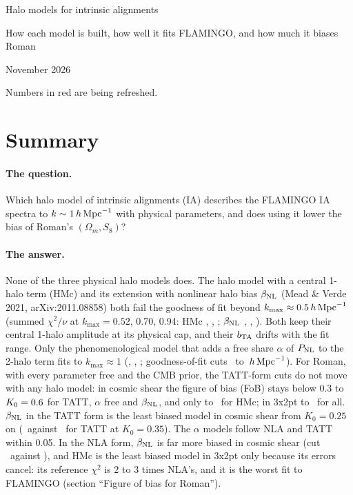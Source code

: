 \documentclass[11pt]{article}
\newcommand{\hMpc}{\,h\,{\rm Mpc}^{-1}}
\newcommand{\PNL}{P_{\rm NL}}
\newcommand{\bTA}{b_{\rm TA}}
\newcommand{\bNL}{\beta_{\rm NL}}
\newcommand{\kmax}{k_{\max}}
\newif\ifnumbersfinal
\begin{document}
\begin{center}
  {\LARGE Halo models for intrinsic alignments\par}
  \vspace{0.6em}
  {\large How each model is built, how well it fits FLAMINGO, and how much it biases Roman\par}
  \vspace{0.6em}
  {\large November 2026\par}
  \ifnumbersfinal\else
    \vspace{0.6em}
    {\color{red}Numbers in red are being refreshed.\par}
  \fi
\end{center}
\vspace{1em}

\section{Summary}
\label{sec:summary}

\paragraph{The question.}
Which halo model of intrinsic alignments (IA) describes the FLAMINGO IA
spectra to $k \sim 1\hMpc$ with physical parameters, and does using it
lower the bias of Roman's $(\Omega_m, S_8)$?

\paragraph{The answer.}
None of the three physical halo models does. The halo model with a central
1-halo term (HMc) and its extension with nonlinear halo bias $\bNL$ (Mead \&
Verde 2021, arXiv:2011.08858) both fail the goodness of fit beyond
$\kmax \approx 0.5\hMpc$ (summed $\chi^2/\nu$ at $\kmax = 0.52$, 0.70, 0.94:
HMc \gofTattHmcA, \gofTattHmcB, \gofTattHmcC; $\bNL$ \gofTattNlbA,
\gofTattNlbB, \gofTattNlbC). Both keep their central 1-halo amplitude at its
physical cap, and their $\bTA$ drifts with the fit range. Only the
phenomenological model that adds a free share $\alpha$ of $\PNL$ to the
2-halo term fits to $\kmax \approx 1$ (\gofTattAlphaA, \gofTattAlphaB,
\gofTattAlphaC; goodness-of-fit cuts \cutTattAlphaLo\ to
\cutTattAlphaHi$\hMpc$). For Roman, with every parameter free and the CMB
prior, the TATT-form cuts do not move with any halo model: in cosmic shear the
figure of bias (FoB) stays below 0.3 to $K_0 = 0.6$ for TATT,
$\alpha$ free and $\bNL$, and only to \kmaxCsTattHmc\ for HMc; in 3x2pt to
\kmaxTxTattBase\ for all. $\bNL$ in the TATT form is the least biased model in
cosmic shear from $K_0 = 0.25$ on (\fobCsTattNlb\ against \fobCsTattBase\ for TATT at
$K_0 = 0.35$). The $\alpha$ models follow NLA and TATT within 0.05. In the NLA
form, $\bNL$ is far more biased in cosmic shear (cut \kmaxCsNlaNlb\ against
\kmaxCsNlaBase), and HMc is the least biased model in 3x2pt only because
its errors cancel: its reference $\chi^2$ is 2 to 3 times NLA's, and it is
the worst fit to FLAMINGO (section ``Figure of bias for Roman'').
\end{document}
